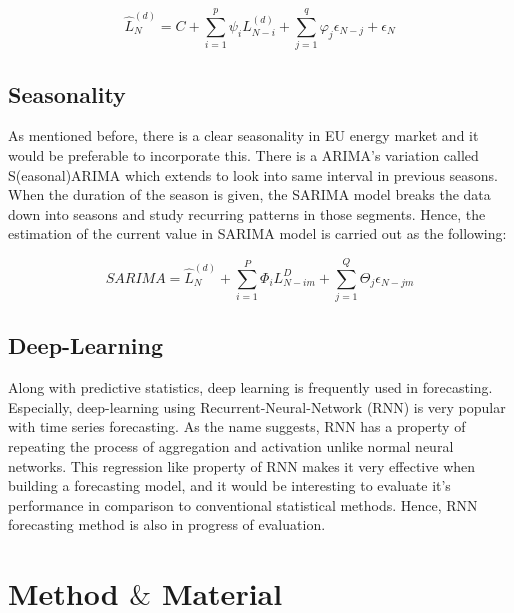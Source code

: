 \documentclass[acmtog]{acmart}
\begin{document}
\begin{displaymath}
    \hat{L}_N^{(d)} = C + \sum_{i=1}^{p} \psi_i L_{N - i}^{(d)} + \sum_{j=1}^{q}\varphi_j\epsilon_{N-j} + \epsilon_{N}
\end{displaymath}

\subsection{Seasonality}

As mentioned before, there is a clear seasonality in EU energy market and it would be preferable to incorporate this. There is a ARIMA's variation called S(easonal)ARIMA which extends to look into same interval in previous seasons. When the duration of the season is given, the SARIMA model breaks the data down into seasons and study recurring patterns in those segments. Hence, the estimation of the current value in SARIMA model is carried out as the following:

\begin{displaymath}
    SARIMA = \hat{L}_N^{(d)} + \sum_{i=1}^{P}\Phi_i L_{N - im}^{D} + \sum_{j=1}^{Q}\Theta_j \epsilon_{N - jm}  
\end{displaymath} 

\subsection{Deep-Learning}
Along with predictive statistics, deep learning is frequently used in forecasting. Especially, deep-learning using Recurrent-Neural-Network (RNN) is very popular with time series forecasting. As the name suggests, RNN has a property of repeating the process of aggregation and activation unlike normal neural networks. This regression like property of RNN makes it very effective when building a forecasting model, and it would be interesting to evaluate it's performance in comparison to conventional statistical methods. Hence, RNN forecasting method is also in progress of evaluation. \\

\section{Method ${\&}$ Material}
\end{document}
